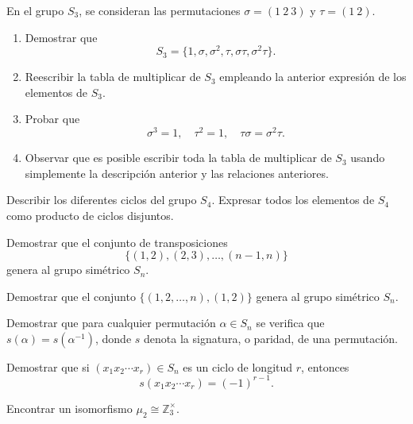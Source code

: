 \begin{ejercicio}\label{ej:2.19}
    En el grupo $S_3$, se consideran las permutaciones $\sigma = (1\ 2\ 3)$ y $\tau = (1\ 2)$.
    \begin{enumerate}
        \item Demostrar que
        $$S_3 = \{1, \sigma, \sigma^2, \tau, \sigma\tau, \sigma^2\tau\}.$$
        \item Reescribir la tabla de multiplicar de $S_3$ empleando la anterior expresión de los elementos de $S_3$.
        \item Probar que
        $$\sigma^3 = 1, \quad \tau^2 = 1, \quad \tau\sigma = \sigma^2\tau.$$
        \item Observar que es posible escribir toda la tabla de multiplicar de $S_3$ usando simplemente la descripción anterior y las relaciones anteriores.
    \end{enumerate}
\end{ejercicio}

\begin{ejercicio}\label{ej:2.20}
    Describir los diferentes ciclos del grupo $S_4$. Expresar todos los elementos de $S_4$ como producto de ciclos disjuntos.
\end{ejercicio}

\begin{ejercicio}\label{ej:2.21}
    Demostrar que el conjunto de transposiciones
    $$\{(1, 2), (2, 3), \ldots, (n - 1, n)\}$$
    genera al grupo simétrico $S_n$.
\end{ejercicio}

\begin{ejercicio}\label{ej:2.22}
    Demostrar que el conjunto $\{(1, 2, \ldots, n), (1, 2)\}$ genera al grupo simétrico $S_n$.
\end{ejercicio}

\begin{ejercicio}\label{ej:2.23}
    Demostrar que para cualquier permutación $\alpha \in S_n$ se verifica que $s(\alpha) = s(\alpha^{-1})$, donde $s$ denota la signatura, o paridad, de una permutación.
\end{ejercicio}

\begin{ejercicio}\label{ej:2.24}
    Demostrar que si $(x_1x_2 \cdots x_r) \in S_n$ es un ciclo de longitud $r$, entonces
    $$s(x_1x_2 \cdots x_r) = (-1)^{r - 1}.$$
\end{ejercicio}

\begin{ejercicio}\label{ej:2.25}
    Encontrar un isomorfismo $\mu_2 \cong \mathbb{Z}^{\times}_3$.
\end{ejercicio}

